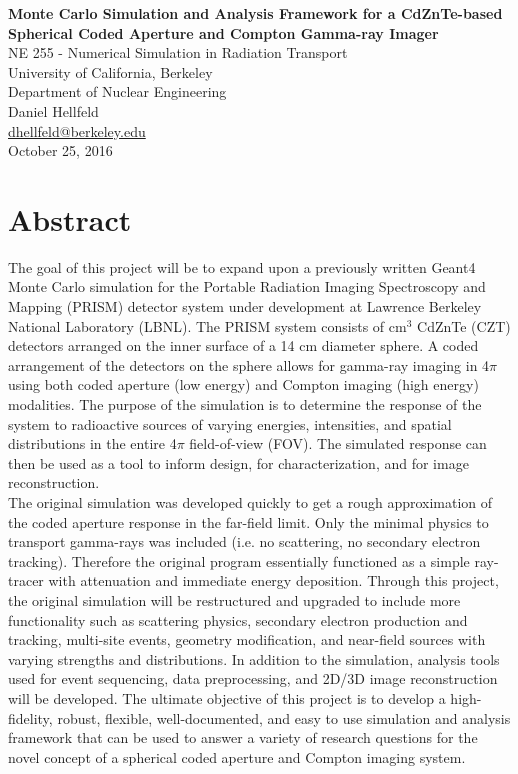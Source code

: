 \documentclass[10pt]{article}
\begin{document}
\begin{centering}
\textbf{Monte Carlo Simulation and Analysis Framework for a CdZnTe-based Spherical Coded Aperture and Compton Gamma-ray Imager}\\
\vspace{10pt}
NE 255 - Numerical Simulation in Radiation Transport\\
University of California, Berkeley\\
Department of Nuclear Engineering\\
\vspace{10pt}
Daniel Hellfeld\\
\href{mailto:dhellfeld@berkeley.edu}{dhellfeld@berkeley.edu}\\
\vspace{10pt}
October 25, 2016 \\
\end{centering}


\section*{Abstract}

The goal of this project will be to expand upon a previously written Geant4 Monte Carlo simulation for the Portable Radiation Imaging Spectroscopy and Mapping (PRISM) detector system under development at Lawrence Berkeley National Laboratory (LBNL). The PRISM system consists of cm$^3$ CdZnTe (CZT) detectors arranged on the inner surface of a 14 cm diameter sphere. A coded arrangement of the detectors on the sphere allows for gamma-ray imaging in 4$\pi$ using both coded aperture (low energy) and Compton imaging (high energy) modalities. The purpose of the simulation is to determine the response of the system to radioactive sources of varying energies, intensities, and spatial distributions in the entire 4$\pi$ field-of-view (FOV). The simulated response can then be used as a tool to inform design, for characterization, and for image reconstruction. \\

The original simulation was developed quickly to get a rough approximation of the coded aperture response in the far-field limit. Only the minimal physics to transport gamma-rays was included (i.e. no scattering, no secondary electron tracking). Therefore the original program essentially functioned as a simple ray-tracer with attenuation and immediate energy deposition. Through this project, the original simulation will be restructured and upgraded to include more functionality such as scattering physics, secondary electron production and tracking, multi-site events, geometry modification, and near-field sources with varying strengths and distributions. In addition to the simulation, analysis tools used for event sequencing, data preprocessing, and 2D/3D image reconstruction will be developed. The ultimate objective of this project is to develop a high-fidelity, robust, flexible, well-documented, and easy to use simulation and analysis framework that can be used to answer a variety of research questions for the novel concept of a spherical coded aperture and Compton imaging system. \\
\end{document}
